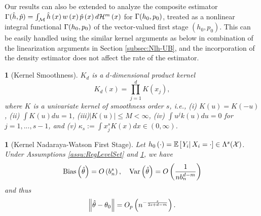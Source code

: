 \documentclass[12pt,american]{article}
\theoremstyle{definition}
\theoremstyle{plain}
\newtheorem{assumption}{\protect\assumptionname}
\theoremstyle{definition}
\theoremstyle{plain}
\theoremstyle{plain}
\newtheorem{thm}{\protect\theoremname}
\theoremstyle{plain}
\theoremstyle{plain}
\theoremstyle{plain}
\newcommand{\E}{\mathbb{E}}
\newcommand{\norm}[1]{\left\| #1 \right\|}
\providecommand{\assumptionname}{Assumption}
\providecommand{\theoremname}{Theorem}
\providecommand{\assumptionname}{Assumption}
\providecommand{\theoremname}{Theorem}
\begin{document}
Our results can also be extended to analyze the composite estimator $\Gamma(\hat{h},\hat{p})=\int_{{\cal M}}\hat{h}\left(x\right)w\left(x\right)\hat{p}\left(x\right)d{\cal H}^{m}\left(x\right)$ for $\Gamma(h_0,p_0)$, treated as a nonlinear integral functional $\Gamma(h_0,p_0)$ of the vector-valued first stage $(h_0,p_0)$. This can be easily handled using the similar kernel arguments as below in combination of the linearization arguments in Section \ref{subsec:Nlh-UB}, and the incorporation of the density estimator does not affect the rate of the estimator.

\begin{assumption}[Kernel Smoothness]
\label{assu:ker_Ksmooth} $K_{d}$ is a $d$-dimensional product
kernel
\[
K_{d}\left(x\right)=\prod_{j=1}^{d}K\left(x_{j}\right),
\]
where $K$ is a univariate kernel of smoothness order $s$, i.e.,
(i) $K\left(u\right)=K\left(-u\right)$, (ii) $\int K\left(u\right)du=1$,
(iii)$\left|K\left(u\right)\right|\leq M<\infty$, (iv) $\int u^{j}k\left(u\right)du=0$
for $j=1,...,s-1$, and (v) $\kappa_{s}:=\int x_{j}^{s}K\left(x\right)dx\in\left(0,\infty\right)$.
\end{assumption}
\begin{thm}[\label{thm:KernANorm}Kernel Nadaraya-Watson First Stage]
 Let $h_{0}\left(\cdot \right)=\E\left[\rest{Y_{i}}X_{i}=\cdot \right] \in \Lambda^s (\mathcal{X})$. Under Assumptions \ref{assu:RegLevelSet} and \ref{assu:ker_Ksmooth}, we have
\[
\text{Bias}\left(\hat{\theta}\right)=O\left(b_{n}^{s}\right),\quad\text{Var}\left(\hat{\theta}\right)=O\left(\frac{1}{nb_{n}^{d-m}}\right)
\]
and thus
\[
\norm{\hat{\t}-\t_{0}}=O_{p}\left(n^{-\frac{s}{2s+d-m}}\right).
\]
\end{thm}
\end{document}
